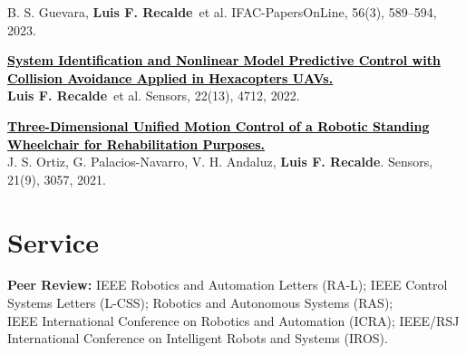 \documentclass[letterpaper,11pt]{article}
\newcommand{\authorname}{\textcolor{AuthorTeal}{\textbf{Luis F. Recalde}}}
\newcommand{\journal}[1]{\textcolor{HeadingNavy}{#1}}
\newcommand{\papertitle}[1]{\textcolor{black}{\textbf{#1}}}
\begin{document}
\begin{enumerate}[leftmargin=0.28in, label={[\arabic*]}, itemsep=3pt, parsep=0pt, topsep=3pt]
B. S. Guevara, \authorname\ et al. \journal{IFAC-PapersOnLine}, 56(3), 589--594, 2023.
\item \href{https://doi.org/10.3390/s22134712}{\papertitle{System Identification and Nonlinear Model Predictive Control with Collision Avoidance Applied in Hexacopters UAVs.}}\\
\authorname\ et al. \journal{Sensors}, 22(13), 4712, 2022.
\item \href{https://doi.org/10.3390/s21093057}{\papertitle{Three-Dimensional Unified Motion Control of a Robotic Standing Wheelchair for Rehabilitation Purposes.}}\\
J. S. Ortiz, G. Palacios-Navarro, V. H. Andaluz, \authorname. \journal{Sensors}, 21(9), 3057, 2021.
\end{enumerate}
\section{Service}
{\small
\textbf{Peer Review:} IEEE Robotics and Automation Letters (RA-L); IEEE Control Systems Letters (L-CSS); Robotics and Autonomous Systems (RAS);\\
IEEE International Conference on Robotics and Automation (ICRA); IEEE/RSJ International Conference on Intelligent Robots and Systems (IROS).\par}
\end{document}

